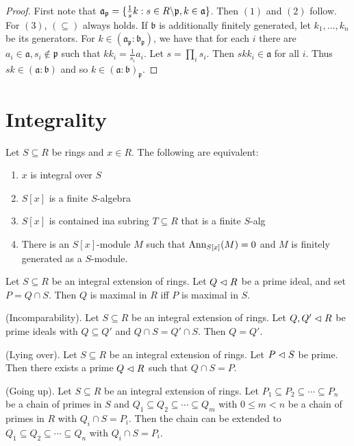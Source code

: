 \documentclass{memoir}
\begin{document}
\begin{proof}
    First note that $\mathfrak a_{\mathfrak p} = \lbrace\frac1sk:s\in R\backslash\mathfrak p, k\in \mathfrak a\rbrace$.
    Then $(1)$ and $(2)$ follow.
    For $(3)$, $(\subseteq)$ always holds.
    If $\mathfrak b$ is additionally finitely generated, let $k_1,\dots,k_n$ be its generators.
    For $k\in (\mathfrak a_{\mathfrak p}:\mathfrak b_{\mathfrak p})$, we have that for each $i$ there are $a_i\in\mathfrak a, s_i\not\in\mathfrak p$ such that $kk_i = \frac1{s_i}a_i$.
    Let $s = \prod_is_i$. Then $skk_i\in\mathfrak a$ for all $i$.
    Thus $sk\in(\mathfrak a:\mathfrak b)$ and so $k\in(\mathfrak a:\mathfrak b)_{\mathfrak p}$.
\end{proof}
\section{Integrality}
\begin{thm}
    \label{thm:int_dep}
    Let $S\subseteq R$ be rings and $x\in R$.
    The following are equivalent:
    \begin{enumerate}
        \item $x$ is integral over $S$
        \item $S[x]$ is a finite $S$-algebra
        \item $S[x]$ is contained ina subring $T\subseteq R$ that is a finite $S$-alg
        \item There is an $S[x]$-module $M$ such that $\text{Ann}_{S[x]}(M) = 0$ and $M$ is finitely generated as a $S$-module.
    \end{enumerate}
\end{thm}
\begin{lemma}
    Let $S\subseteq R$ be an integral extension of rings. 
    Let $Q\vartriangleleft R$ be a prime ideal, and set $P = Q\cap S$.
    Then $Q$ is maximal in $R$ iff $P$ is maximal in $S$.
\end{lemma}
\begin{lemma}
    (Incomparability).
    Let $S\subseteq R$ be an integral extension of rings.
    Let $Q,Q'\vartriangleleft R$ be prime ideals with $Q\subseteq Q'$ and $Q\cap S = Q'\cap S$. 
    Then $Q = Q'$.
\end{lemma}
\begin{lemma}
    (Lying over).
    Let $S\subseteq R$ be an integral extension of rings.
    Let $P\vartriangleleft S$ be prime.
    Then there exists a prime $Q\vartriangleleft R$ such that $Q\cap S = P$.
\end{lemma}
\begin{thm}
    \label{thm:going_up}
    (Going up).
    Let $S\subseteq R$ be an integral extension of rings.
    Let $P_1\subseteq P_2\subseteq \cdots \subseteq P_n$ be a chain of primes in $S$ and $Q_1\subseteq Q_2\subseteq \cdots \subseteq Q_m$ with $0\le m < n$ be a chain of primes in $R$ with $Q_i\cap S = P_i$.
    Then the chain can be extended to $Q_1\subseteq Q_2\subseteq \cdots \subseteq Q_n$ with $Q_i\cap S = P_i$.
\end{thm}
\end{document}
